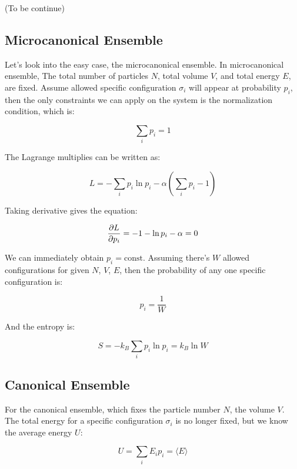 \documentclass[../main.tex]{subfiles}
\begin{document}
(To be continue)


\subsection{Microcanonical Ensemble}

Let's look into the easy case, the microcanonical ensemble. In microcanonical ensemble, The total number of particles $N$, total volume $V$, and total energy $E$, are fixed. Assume allowed specific configuration $\sigma_i$ will appear at probability $p_i$, then the only constraints we can apply on the system is the normalization condition, which is:

\begin{equation}
    \sum_{i} p_i = 1
\end{equation}

The Lagrange multiplies can be written as:

\begin{equation}
    L = -\sum_{i} p_i \ln p_i - \alpha(\sum_{i} p_i - 1)
\end{equation}

Taking derivative gives the equation:

\begin{equation}
    \pdv{L}{p_i} = -1 - \ln p_i - \alpha = 0
\end{equation}

We can immediately obtain $p_i = \textrm{const}$. Assuming there's $W$ allowed configurations for given $N$, $V$, $E$, then the probability of any one specific configuration is:

\begin{equation}
    p_i = \frac{1}{W}
\end{equation}

And the entropy is:

\begin{equation}
    S = -k_B \sum_{i} p_i \ln p_i = k_B \ln W
\end{equation}

\subsection{Canonical Ensemble}

For the canonical ensemble, which fixes the particle number $N$, the volume $V$. The total energy for a specific configuration $\sigma_i$ is no longer fixed, but we know the average energy $U$:

\begin{equation}
    U = \sum_{i} E_i p_i = \langle E \rangle
\end{equation}
\end{document}
